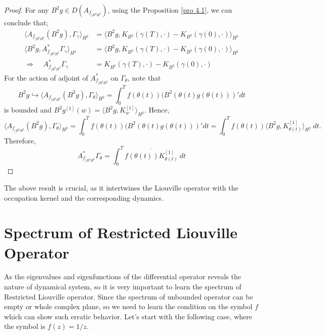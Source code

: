 \documentclass[preprint,12pt]{elsarticle} %
\theoremstyle{plain}
\theoremstyle{definition}
\theoremstyle{remark}
\begin{document}
\begin{proof}
    For any $B^2 g\in D(A_{f_{|B^2 H^2}})$, using the Proposition \ref{pro 4.1}, we can conclude that;
    \begin{align*}
        \langle A_{f_{|B^2 H^2}} (B^2 g),\Gamma_{\gamma}\rangle_{H^2} &= \langle B^2 g, K_{B^2}(\gamma(T),\cdot)- K_{B^2}(\gamma(0),\cdot)\rangle_{H^2}\\
        \langle  B^2 g, A_{f_{|B^2 H^2}}^{*}\Gamma_{\gamma}\rangle_{H^2}&= \langle B^2 g, K_{B^2}(\gamma(T),\cdot)- K_{B^2}(\gamma(0),\cdot)\rangle_{H^2}\\
       \Rightarrow~~~~~ A_{f_{|B^2 H^2}}^{*}\Gamma_{\gamma} &= K_{B^2}(\gamma(T),\cdot)- K_{B^2}(\gamma(0),\cdot)
    \end{align*}
 For the action of adjoint of $A_{f_{|B^2 H^2}}^{*}$ on $\Gamma_{\theta}$, note that 
 $$B^2 g\hookrightarrow \langle A_{f_{|B^2 H^2}} (B^2 g),\Gamma_{\theta}\rangle_{H^2}=\int_{0}^{T}f(\theta(t))(B^2(\theta(t) g(\theta(t)))'dt$$ is bounded and $B^2g^{[1]}(w)=\langle B^2g, K_{w}^{[1]}\rangle_{H^2}$. Hence,
 $$\langle A_{f_{|B^2 H^2}} (B^2 g),\Gamma_{\theta}\rangle_{H^2}=\int_{0}^{T}f(\theta(t))(B^2(\theta(t) g(\theta(t)))'dt= \int_{0}^{T}f(\theta(t))\langle B^2g, K_{\theta(t)}^{[1]}\rangle_{H^2}~dt.$$ Therefore,
 $$ A_{f_{|B^2 H^2}}^{*}\Gamma_{\theta}= \int_{0}^{T}\overline{f(\theta(t))K_{\theta(t)}^{[1]}}~dt$$
\end{proof}
The above result is crucial, as it intertwines the Liouville operator with the occupation kernel and the corresponding dynamics.

\section{Spectrum of Restricted Liouville Operator}\label{Sec 6}

As the eigenvalues and eigenfunctions of the differential operator reveals the nature of dynamical system, so it is very important to learn the spectrum of Restricted Liouville operator. Since the spectrum of unbounded operator can be empty or whole complex plane, so we need to learn the condition on the symbol $f$ which can show such erratic behavior. Let's start with the following case, where the symbol is $f(z)=1/z$. 
\end{document}
